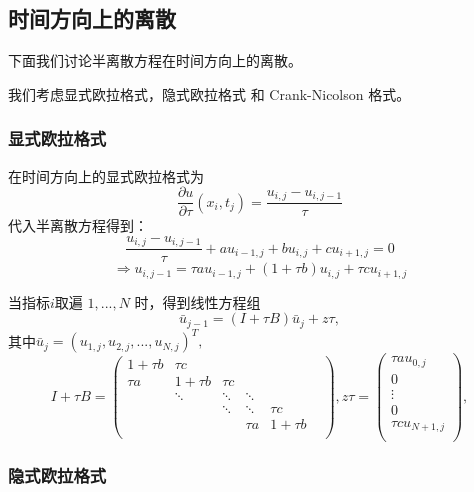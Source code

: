 \documentclass{article}
\begin{document}
\subsection{时间方向上的离散}

下面我们讨论半离散方程在时间方向上的离散。

我们考虑显式欧拉格式，隐式欧拉格式 和 Crank-Nicolson 格式。

\subsubsection{显式欧拉格式}

在时间方向上的显式欧拉格式为$$\frac{\partial u}{\partial \tau}(x_i, t_j) = \frac{u_{i, j} - u_{i, j-1}}{\tau}$$
代入半离散方程得到：$$\frac{u_{i, j} - u_{i, j-1}}{\tau} + au_{i-1, j} + bu_{i, j} + cu_{i+1, j} = 0$$
$$\Rightarrow u_{i, j-1} = \tau au_{i-1, j} + (1 + \tau b)u_{i, j} + \tau cu_{i+1, j}$$

当指标$i$取遍 $1,...,N$ 时，得到线性方程组$$\bar{u}_{j-1} = (I + \tau B)\bar{u}_{j} + z\tau,$$
其中$\bar{u}_{j} = (u_{1, j}, u_{2, j},...,u_{N, j})^T,$
$$
I + \tau B = \begin{pmatrix}
                1 +\tau b  &   \tau c     &            &            &            & \\
                \tau a     &   1 +\tau b  &   \tau c   &            &            & \\
                           &   \ddots     &   \ddots   &   \ddots   &            & \\
                           &              &   \ddots   &   \ddots   &  \tau c    & \\
                           &              &            &   \tau a   &  1 +\tau b & \\
            \end{pmatrix},
z\tau = \begin{pmatrix}
            \tau au_{0, j}   \\
            0                \\
            \vdots           \\
            0                \\
            \tau cu_{N+1, j} \\
        \end{pmatrix},
$$

\subsubsection{隐式欧拉格式}
\end{document}
